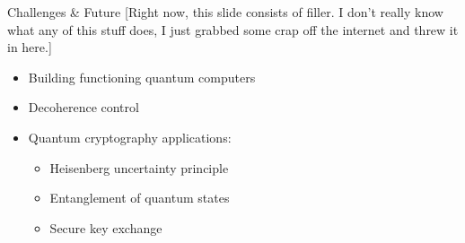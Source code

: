 \documentclass{beamer}
\begin{document}


\begin{frame}{Challenges \& Future}
	[Right now, this slide consists of filler. I don't really know what any of this stuff does, I just grabbed some crap off the internet and threw it in here.]
    \begin{itemize}
        \item Building functioning quantum computers
        \item Decoherence control
        \item Quantum cryptography applications:
            \begin{itemize}
                \item Heisenberg uncertainty principle
                \item Entanglement of quantum states
                \item Secure key exchange
            \end{itemize}
    \end{itemize}
\end{frame}
\end{document}

